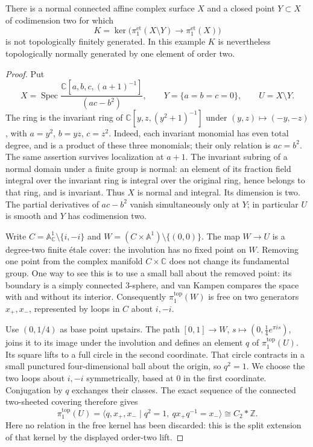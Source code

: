 \begin{proposition}\label{D:kernel-counterexample}
There is a normal connected affine complex surface $X$ and a closed point
$Y\subset X$ of codimension two for which
\[
 K=\ker\bigl(\pi_1^{\mathrm{et}}(X\setminus Y)\longrightarrow
                     \pi_1^{\mathrm{et}}(X)\bigr)
\]
is not topologically finitely generated. In this example $K$ is nevertheless
topologically normally generated by one element of order two.
\end{proposition}
\begin{proof}
Put
\[
 X=\operatorname{Spec}
 \frac{\mathbb C[a,b,c,(a+1)^{-1}]}{(ac-b^2)},\qquad
 Y=\{a=b=c=0\},\qquad U=X\setminus Y.
\]
The ring is the invariant ring of
$\mathbb C[y,z,(y^2+1)^{-1}]$ under $(y,z)\mapsto(-y,-z)$,
with $a=y^2$, $b=yz$, $c=z^2$. Indeed, each invariant monomial has
even total degree, and is a product of these three monomials; their only
relation is $ac=b^2$. The same assertion survives localization at $a+1$.
The invariant subring of a normal domain under a finite group is normal:
an element of its fraction field integral over the invariant ring is
integral over the original ring, hence belongs to that ring, and is
invariant. Thus $X$ is normal and integral. Its dimension is two.
The partial derivatives of $ac-b^2$ vanish simultaneously only at $Y$;
in particular $U$ is smooth and $Y$ has codimension two.

Write $C=\mathbb A^1_{\mathbb C}\setminus\{i,-i\}$ and
$W=(C\times\mathbb A^1)\setminus\{(0,0)\}$. The map $W\to U$
is a degree-two finite \'etale cover: the involution has no fixed point
on $W$. Removing one point from the complex manifold $C\times\mathbb C$
does not change its fundamental group. One way to see this is to use a
small ball about the removed point: its boundary is a simply connected
$3$-sphere, and van Kampen compares the space with and without its
interior. Consequently $\pi_1^{\mathrm{top}}(W)$ is free on two
generators $x_+,x_-$, represented by loops in $C$ about $i,-i$.

Use $(0,1/4)$ as base point upstairs. The path
$[0,1]\to W$, $s\mapsto(0,\tfrac14 e^{\pi i s})$, joins it to its image under
the involution and defines an element $q$ of $\pi_1^{\mathrm{top}}(U)$.
Its square lifts to a full circle in the second coordinate. That circle
contracts in a small punctured four-dimensional ball about the origin,
so $q^2=1$. We choose the two loops about $i,-i$ symmetrically, based at
$0$ in the first coordinate. Conjugation by $q$ exchanges their classes.
The exact sequence of the connected two-sheeted covering therefore gives
\[
 \pi_1^{\mathrm{top}}(U)
 =\langle q,x_+,x_-\mid q^2=1,\ qx_+q^{-1}=x_-\rangle
 \cong C_2*\mathbb Z.
\]
Here no relation in the free kernel has been discarded: this is the
split extension of that kernel by the displayed order-two lift.


\end{proof}
